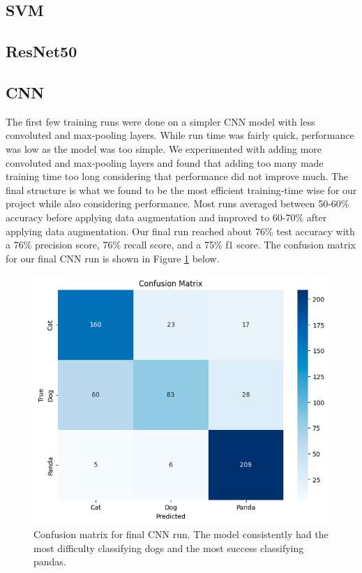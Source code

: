 \subsection{SVM}

\subsection{ResNet50}

\subsection{CNN}
The first few training runs were done on a simpler CNN model with less convoluted and max-pooling layers. While run time was fairly quick, performance was low as the model was too simple. We experimented with adding more convoluted and max-pooling layers and found that adding too many made training time too long considering that performance did not improve much. The final structure is what we found to be the most efficient training-time wise for our project while also considering performance. Most runs averaged between 50-60\% accuracy before applying data augmentation and improved to 60-70\% after applying data augmentation. Our final run reached about 76\% test accuracy with a 76\% precision score, 76\% recall score, and a 75\% f1 score. The confusion matrix for our final CNN run is shown in Figure \ref{fig:figure4} below.

\begin{figure}[h]
	\centering
	\includegraphics[scale=0.5]{CNN_cfm}
	\caption{Confusion matrix for final CNN run. The model consistently had the most difficulty classifying dogs and the most success classifying pandas.}
	\label{fig:figure4}
\end{figure}

